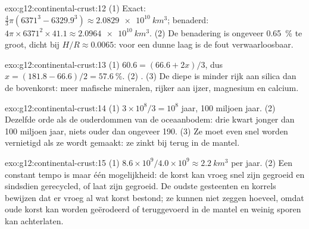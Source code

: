 \begin{solution}{exo:g12:continental-crust:12}
(1) Exact: $\tfrac{4}{3}\pi(6371^3 - 6329.9^3) \approx
\qty{2.0829e10}{km^3}$; benaderd: $4\pi \times 6371^2 \times 41.1
\approx \qty{2.0964e10}{km^3}$. (2) De benadering is ongeveer
\qty{0.65}{\percent} te groot, dicht bij $H/R \approx 0.0065$: voor een dunne laag is de
fout verwaarloosbaar.
\end{solution}

\begin{solution}{exo:g12:continental-crust:13}
(1) $60.6 = (66.6 + 2x)/3$, dus $x = (181.8 - 66.6)/2 = \qty{57.6}{\percent}$.
(2) . (3) De diepe  is minder rijk aan silica dan
de bovenkorst: meer mafische mineralen, rijker aan ijzer, magnesium en calcium.
\end{solution}

\begin{solution}{exo:g12:continental-crust:14}
(1) $3 \times 10^8/3 = 10^8$ jaar, 100 miljoen jaar. (2) Dezelfde orde als
de ouderdommen van de oceaanbodem: drie kwart jonger dan 100 miljoen jaar,
niets ouder dan ongeveer 190. (3) Ze moet even snel worden vernietigd als ze wordt gemaakt:
ze zinkt bij  terug in de mantel.
\end{solution}

\begin{solution}{exo:g12:continental-crust:15}
(1) $8.6 \times 10^9 / 4.0 \times 10^9 \approx \qty{2.2}{km^3}$ per jaar.
(2) Een constant tempo is maar één mogelijkheid: de korst kan vroeg snel zijn gegroeid
en sindsdien gerecycled, of laat zijn gegroeid. De oudste gesteenten en korrels bewijzen
dat er vroeg al wat korst bestond; ze kunnen niet zeggen hoeveel, omdat oude korst
kan worden geërodeerd of teruggevoerd in de mantel en weinig sporen kan achterlaten.
\end{solution}

